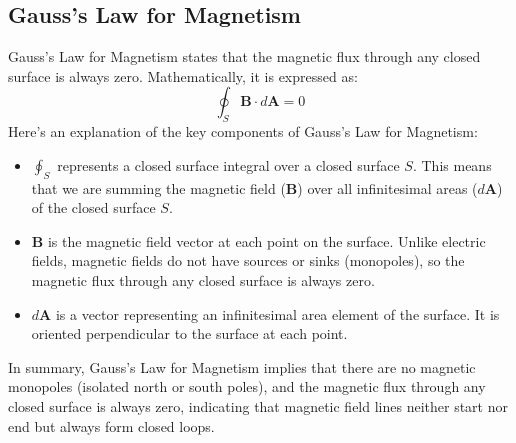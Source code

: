\subsection{Gauss's Law for Magnetism}
Gauss's Law for Magnetism states that the magnetic flux through any closed surface is always zero.
Mathematically, it is expressed as:
\[
\oint_S \mathbf{B} \cdot d\mathbf{A} = 0
\]
Here's an explanation of the key components of Gauss's Law for Magnetism:
\begin{itemize}
  \item $\oint_S$ represents a closed surface integral over a closed surface $S$. This means that we are summing the magnetic field ($\mathbf{B}$) over all infinitesimal areas ($d\mathbf{A}$) of the closed surface $S$.
  
  \item $\mathbf{B}$ is the magnetic field vector at each point on the surface. Unlike electric fields, magnetic fields do not have sources or sinks (monopoles), so the magnetic flux through any closed surface is always zero.
  
  \item $d\mathbf{A}$ is a vector representing an infinitesimal area element of the surface. It is oriented perpendicular to the surface at each point.
\end{itemize}

In summary, Gauss's Law for Magnetism implies that there are no magnetic monopoles (isolated north or south poles), and the magnetic flux through any closed surface is always zero, indicating that magnetic field lines neither start nor end but always form closed loops.


